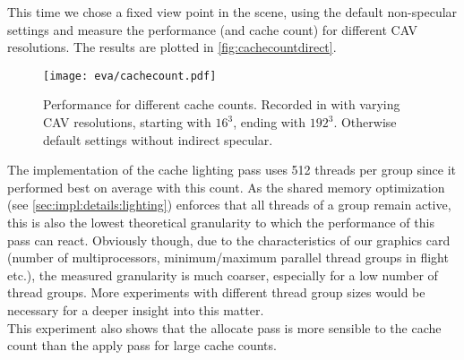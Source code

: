 \documentclass[thesis.tex]{subfiles}
\begin{document}
This time we chose a fixed view point in the  scene, using the default non-specular settings and measure the performance (and cache count) for different CAV resolutions.
The results are plotted in \autoref{fig:cachecountdirect}.
\\
\begin{figure}[h]
\centering
\texttt{[image: eva/cachecount.pdf]}
\caption{Performance for different cache counts. Recorded in  with varying CAV resolutions, starting with $16^3$, ending with $192^3$. Otherwise default settings without indirect specular. }
\label{fig:cachecountdirect}
\end{figure}
The implementation of the cache lighting pass uses 512 threads per group since it performed best on average with this count.
As the shared memory optimization (see \autoref{sec:impl:details:lighting}) enforces that all threads of a group remain active, this is also the lowest theoretical granularity to which the performance of this pass can react.
Obviously though, due to the characteristics of our graphics card (number of multiprocessors, minimum/maximum parallel thread groups in flight etc.), the measured granularity is much coarser, especially for a low number of thread groups.
More experiments with different thread group sizes would be necessary for a deeper insight into this matter.
\\
This experiment also shows that the allocate pass is more sensible to the cache count than the apply pass for large cache counts.
\end{document}
